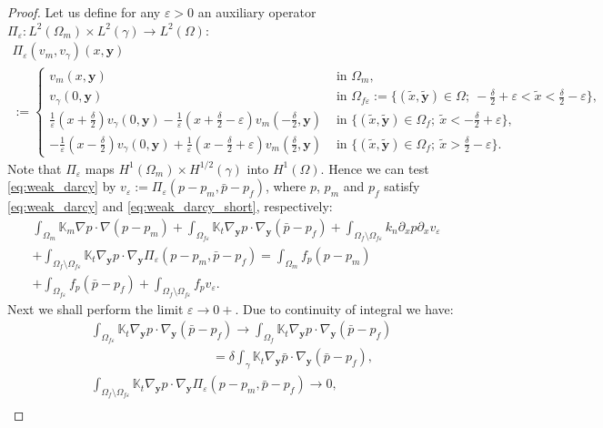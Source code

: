 \documentclass[a4paper]{article}
\def\vc#1{\mathbf{\boldsymbol{#1}}}     %
\def\tn#1{{\mathbb{#1}}}    %
\def\ep{\varepsilon}
\def\yy{{\vc y}}
\begin{document}
\begin{proof}
Let us define for any $\ep>0$ an auxiliary operator $\Pi_\ep:L^2(\Omega_m)\times L^2(\gamma)\to L^2(\Omega)$:
\begin{multline*}
\Pi_\ep(v_m,v_\gamma)(x,\vc y)\\ :=
\begin{cases}
v_m(x,\vc y) & \mbox{ in }\Omega_m,\\
v_\gamma(0,\vc y) & \mbox{ in }\Omega_{f\ep}:=\{(\tilde x,\tilde{\vc y})\in\Omega;~-\frac\delta2+\ep<\tilde x<\frac\delta2-\ep\},\\
\frac1\ep(x+\frac\delta2)v_\gamma(0,\vc y) - \frac1\ep(x+\frac\delta2-\ep)v_m(-\frac\delta2,\vc y) & \mbox{ in }\{(\tilde x,\tilde{\vc y})\in\Omega_f;~\tilde x<-\frac\delta2+\ep\},\\
-\frac1\ep(x-\frac\delta2)v_\gamma(0,\vc y) + \frac1\ep(x-\frac\delta2+\ep)v_m(\frac\delta2,\vc y) & \mbox{ in }\{(\tilde x,\tilde{\vc y})\in\Omega_f;~\tilde x>\frac\delta2-\ep\}.
\end{cases}
\end{multline*}
Note that $\Pi_\ep$ maps $H^1(\Omega_m)\times H^{1/2}(\gamma)$ into $H^1(\Omega)$.
Hence we can test \eqref{eq:weak_darcy} by $v_\ep:=\Pi_\ep(p-p_m,\bar p-p_f)$, where $p$, $p_m$ and $p_f$ satisfy \eqref{eq:weak_darcy} and \eqref{eq:weak_darcy_short}, respectively:
\begin{multline}
\label{eq:global_vk}
\int_{\Omega_m}\tn K_m\nabla p\cdot\nabla(p-p_m)
+\int_{\Omega_{f\ep}}\tn K_t\nabla_\yy p\cdot\nabla_\yy(\bar p-p_f)
+\int_{\Omega_f\setminus\Omega_{f\ep}} k_n\partial_x p \partial_x v_\ep\\
+ \int_{\Omega_f\setminus\Omega_{f\ep}} \tn K_t\nabla_\yy p \cdot \nabla_\yy\Pi_\ep(p-p_m,\bar p-p_f)
= \int_{\Omega_m} f_p (p-p_m)\\
+ \int_{\Omega_{f\ep}} f_p (\bar p-p_f)
+ \int_{\Omega_f\setminus\Omega_{f\ep}} f_p v_\ep.
\end{multline}
Next we shall perform the limit $\ep\to 0+$.
Due to continuity of integral we have:
\begin{align}
&\int_{\Omega_{f\ep}}\tn K_t\nabla_\yy p\cdot\nabla_\yy(\bar p-p_f) \to \int_{\Omega_f}\tn K_t\nabla_\yy p\cdot\nabla_\yy(\bar p-p_f)\\
&\hspace{4cm} = \delta\int_\gamma\tn K_t\nabla_\yy\bar p\cdot\nabla_\yy(\bar p-p_f),\\
&\int_{\Omega_f\setminus\Omega_{f\ep}} \tn K_t\nabla_\yy p \cdot \nabla_\yy\Pi_\ep(p-p_m,\bar p-p_f) \to 0, \\

\end{align}
\end{proof}
\end{document}
